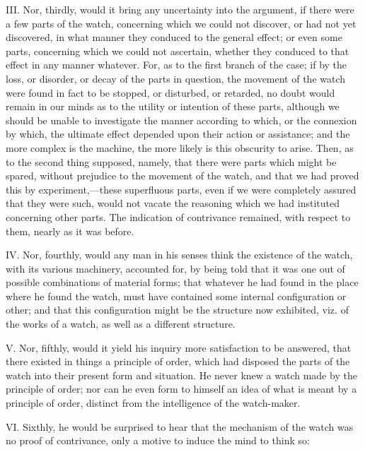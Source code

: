 III. Nor, thirdly, would it bring any uncertainty into the argument,
if there were a few parts of the watch, concerning which we could not
discover, or had not yet discovered, in what manner they conduced to
the general effect; or even some parts, concerning which we could not
ascertain, whether they conduced to that effect in any manner
whatever. For, as to the first branch of the case; if by the loss, or
disorder, or decay of the parts in question, the movement of the watch
were found in fact to be stopped, or disturbed, or retarded, no doubt
would remain in our minds as to the utility or intention of these
parts, although we should be unable to investigate the manner
according to which, or the connexion by which, the ultimate effect
depended upon their action or assistance; and the more complex is the
machine, the more likely is this obscurity to arise. Then, as to the
second thing supposed, namely, that there were parts which might be
spared, without prejudice to the  movement of the watch, and
that we had proved this by experiment,---these superfluous parts, even
if we were completely assured that they were such, would not vacate
the reasoning which we had instituted concerning other parts. The
indication of contrivance remained, with respect to them, nearly as it
was before.

IV. Nor, fourthly, would any man in his senses think the existence of
the watch, with its various machinery, accounted for, by being told
that it was one out of possible combinations of material forms; that
whatever he had found in the place where he found the watch, must
have contained some internal configuration or other; and that this
configuration might be the structure now exhibited, viz. of the works
of a watch, as well as a different structure.

V. Nor, fifthly, would it yield his inquiry more satisfaction to be
answered, that there existed in things a principle of order, which had
disposed the parts of the watch into their present form and situation.
He never knew a watch made by the principle of order; nor can he even
form to himself an idea of what is meant by a principle of order,
distinct from the intelligence of the watch-maker.

VI. Sixthly, he would be surprised to hear  that the mechanism
of the watch was no proof of contrivance, only a motive to induce the
mind to think so:

